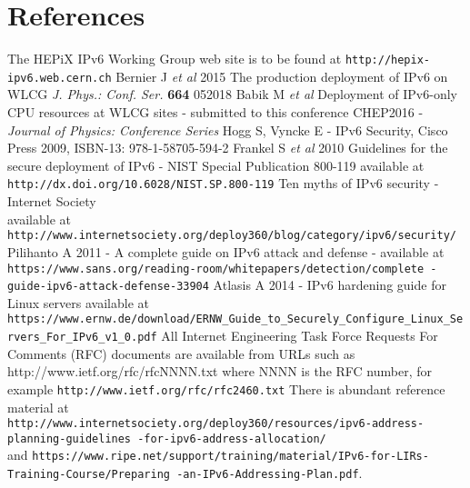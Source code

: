 \section*{References}

\begin{thebibliography}{1}
 The HEPiX IPv6 Working Group web site is to be found at {\tt http://hepix-ipv6.web.cern.ch}
 Bernier J {\it et al} 2015 The production deployment of IPv6 on WLCG  {\it J. Phys.: Conf. Ser.} {\bf664} 052018 
 Babik M {\it et al}  Deployment of IPv6-only CPU resources at WLCG sites - submitted to this conference CHEP2016 - {\it Journal of Physics: Conference Series}
    Hogg S, Vyncke E - IPv6 Security, Cisco Press 2009, ISBN-13: 978-1-58705-594-2
 Frankel S {\it et al} 2010 Guidelines for the secure deployment of IPv6 - NIST Special Publication 800-119 available at {\tt  http://dx.doi.org/10.6028/NIST.SP.800-119}
 Ten myths of IPv6 security - Internet Society \\ available at {\tt http://www.internetsociety.org/deploy360/blog/category/ipv6/security/}
 Pilihanto A 2011 - A complete guide on IPv6 attack and defense - available at \hfill \break 
  {\tt https://www.sans.org/reading-room/whitepapers/detection/complete \hfill \break -guide-ipv6-attack-defense-33904}
 Atlasis A 2014 - IPv6 hardening guide for Linux servers available at \\
  {\tt https://www.ernw.de/download/ERNW\_Guide\_to\_Securely\_Configure\_Linux\_Servers\_For\_IPv6\_v1\_0.pdf}
 All Internet Engineering Task Force Requests For Comments (RFC) documents are available
from URLs such as http://www.ietf.org/rfc/rfcNNNN.txt where NNNN is the RFC number, for example {\tt http://www.ietf.org/rfc/rfc2460.txt}
 There is abundant reference material at \\
{\tt http://www.internetsociety.org/deploy360/resources/ipv6-address-planning-guidelines \hfill \break -for-ipv6-address-allocation/} \\
and {\tt https://www.ripe.net/support/training/material/IPv6-for-LIRs-Training-Course/Preparing \hfill \break-an-IPv6-Addressing-Plan.pdf}.
\end{thebibliography}
